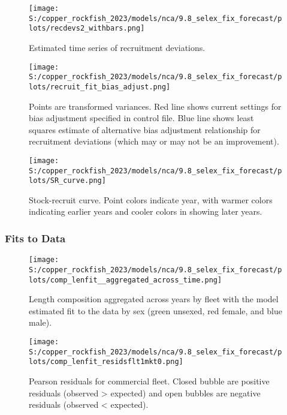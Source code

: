 \documentclass[11pt,
  english,
  letterpaper,
]{article}
\begin{document}
\pagebreak

\begin{figure}
\centering
\texttt{[image: S:/copper\_rockfish\_2023/models/nca/9.8\_selex\_fix\_forecast/plots/recdevs2\_withbars.png]}
\caption{Estimated time series of recruitment deviations.\label{fig:rec-devs}}
\end{figure}

\pagebreak

\begin{figure}
\centering
\texttt{[image: S:/copper\_rockfish\_2023/models/nca/9.8\_selex\_fix\_forecast/plots/recruit\_fit\_bias\_adjust.png]}
\caption{Points are transformed variances. Red line shows current settings for bias adjustment specified in control file. Blue line shows least squares estimate of alternative bias adjustment relationship for recruitment deviations (which may or may not be an improvement).\label{fig:bias-adjust}}
\end{figure}

\newpage

\begin{figure}
\centering
\texttt{[image: S:/copper\_rockfish\_2023/models/nca/9.8\_selex\_fix\_forecast/plots/SR\_curve.png]}
\caption{Stock-recruit curve. Point colors indicate year, with warmer colors indicating earlier years and cooler colors in showing later years.\label{fig:bh-curve}}
\end{figure}

\pagebreak

\hypertarget{fits-to-data}{%
\subsubsection{Fits to Data}\label{fits-to-data}}

\begin{figure}
\centering
\texttt{[image: S:/copper\_rockfish\_2023/models/nca/9.8\_selex\_fix\_forecast/plots/comp\_lenfit\_\_aggregated\_across\_time.png]}
\caption{Length composition aggregated across years by fleet with the model estimated fit to the data by sex (green unsexed, red female, and blue male).\label{fig:len-agg-fit}}
\end{figure}

\pagebreak

\begin{figure}
\centering
\texttt{[image: S:/copper\_rockfish\_2023/models/nca/9.8\_selex\_fix\_forecast/plots/comp\_lenfit\_residsflt1mkt0.png]}
\caption{Pearson residuals for commercial fleet. Closed bubble are positive residuals (observed \textgreater{} expected) and open bubbles are negative residuals (observed \textless{} expected).\label{fig:com-dead-pearson}}
\end{figure}
\end{document}
